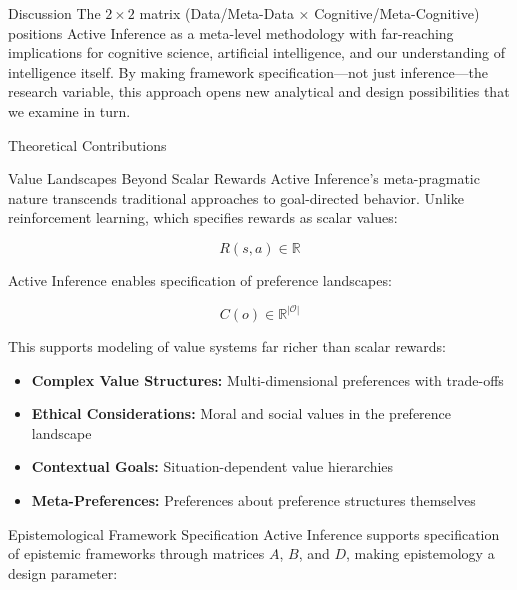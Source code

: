 \documentclass[
  ignorenonframetext,
]{beamer}
\author{\texorpdfstring{}{}}
\date{}
\providecommand{\tightlist}{%
  \setlength{\itemsep}{0pt}\setlength{\parskip}{0pt}}
\begin{document}
\begin{frame}{Discussion}
\protect{}\label{sec:discussion}
The \(2 \times 2\) matrix (Data/Meta-Data × Cognitive/Meta-Cognitive)
positions Active Inference as a meta-level methodology with far-reaching
implications for cognitive science, artificial intelligence, and our
understanding of intelligence itself. By making framework
specification---not just inference---the research variable, this
approach opens new analytical and design possibilities that we examine
in turn.

\begin{block}{Theoretical Contributions}
\protect{}\label{sec:theoretical_contributions}
\begin{block}{Value Landscapes Beyond Scalar Rewards}
\protect{}\label{value-landscapes-beyond-scalar-rewards}
Active Inference's meta-pragmatic nature transcends traditional
approaches to goal-directed behavior. Unlike reinforcement learning,
which specifies rewards as scalar values:

\begin{equation}
R(s,a) \in \mathbb{R}
\label{eq:traditional_reward}
\end{equation}

Active Inference enables specification of preference landscapes:

\begin{equation}
C(o) \in \mathbb{R}^{|\mathcal{O}|}
\label{eq:active_inference_preferences}
\end{equation}

This supports modeling of value systems far richer than scalar rewards:

\begin{itemize}
\tightlist
\item
  \textbf{Complex Value Structures:} Multi-dimensional preferences with
  trade-offs
\item
  \textbf{Ethical Considerations:} Moral and social values in the
  preference landscape
\item
  \textbf{Contextual Goals:} Situation-dependent value hierarchies
\item
  \textbf{Meta-Preferences:} Preferences about preference structures
  themselves
\end{itemize}
\end{block}

\begin{block}{Epistemological Framework Specification}
\protect{}\label{epistemological-framework-specification}
Active Inference supports specification of epistemic frameworks through
matrices \(A\), \(B\), and \(D\), making epistemology a design
parameter:


\end{block}
\end{block}
\end{frame}
\end{document}
